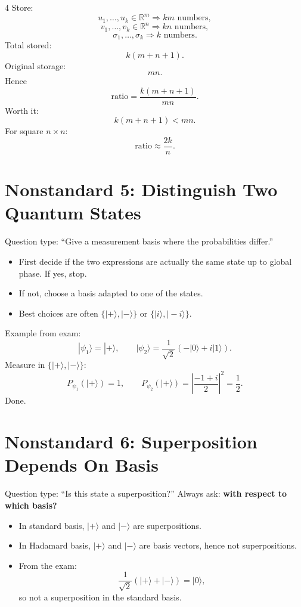 \documentclass[letterpaper]{article}
\newcommand{\bb}[1]{\mathbb{#1}}
\newcommand{\R}{\bb{R}}
\newcommand{\ket}[1]{|#1\rangle}
\begin{document}
\begin{multicols*}{4}
Store:
\[
u_1,\dots,u_k \in \R^m \Rightarrow km \text{ numbers},
\]
\[
v_1,\dots,v_k \in \R^n \Rightarrow kn \text{ numbers},
\]
\[
\sigma_1,\dots,\sigma_k \Rightarrow k \text{ numbers}.
\]
Total stored:
\[
k(m+n+1).
\]
Original storage:
\[
mn.
\]
Hence
\[
\text{ratio}=\frac{k(m+n+1)}{mn}.
\]
Worth it:
\[
k(m+n+1)<mn.
\]
For square $n\times n$:
\[
\text{ratio}\approx \frac{2k}{n}.
\]

\section{Nonstandard 5: Distinguish Two Quantum States}
Question type: ``Give a measurement basis where the probabilities differ.''
\begin{itemize}
\item First decide if the two expressions are actually the same state up to global phase. If yes, stop.
\item If not, choose a basis adapted to one of the states.
\item Best choices are often $\{\ket+,\ket-\}$ or $\{\ket{i},\ket{-i}\}$.
\end{itemize}
Example from exam:
\[
\ket{\psi_1}=\ket+,\qquad
\ket{\psi_2}=\frac{1}{\sqrt2}(-\ket0+i\ket1).
\]
Measure in $\{\ket+,\ket-\}$:
\[
P_{\psi_1}(\ket+)=1,
\qquad
P_{\psi_2}(\ket+)=\left|\frac{-1+i}{2}\right|^2=\frac12.
\]
Done.

\section{Nonstandard 6: Superposition Depends On Basis}
Question type: ``Is this state a superposition?''
Always ask: \textbf{with respect to which basis?}
\begin{itemize}
\item In standard basis, $\ket+$ and $\ket-$ are superpositions.
\item In Hadamard basis, $\ket+$ and $\ket-$ are basis vectors, hence not superpositions.
\item From the exam:
\[
\frac{1}{\sqrt2}(\ket+ + \ket-) = \ket0,
\]
so not a superposition in the standard basis.
\end{itemize}


\end{multicols*}
\end{document}
